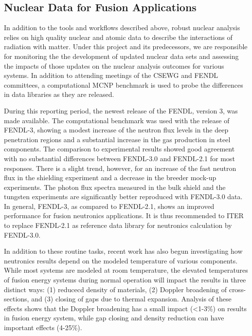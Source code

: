 \subsection{Nuclear Data for Fusion Applications}

In addition to the tools and workflows described above, robust nuclear
analysis relies on high quality nuclear and atomic data to describe the
interactions of radiation with matter.  Under this project and its
predecessors, we are responsible for monitoring the the development of updated
nuclear data sets and assessing the impacts of those updates on the nuclear
analysis outcomes for various systems.  In addition to attending meetings of
the \gls{CSEWG} and \gls{FENDL} committees, a computational MCNP benchmark is
used to probe the differences in data libraries as they are released.

During this reporting period, the newest release of the \gls{FENDL}, version
3, was made available.  The computational benchmark was used with the
release of \gls{FENDL}-3, showing a modest increase of the neutron flux levels
in the deep penetration regions and a substantial increase in the gas
production in steel components.  The comparison to experimental results showed
good agreement with no substantial differences between FENDL-3.0 and FENDL-2.1
for most responses.  There is a slight trend, however, for an increase of the
fast neutron flux in the shielding experiment and a decrease in the breeder
mock-up experiments. The photon flux spectra measured in the bulk shield and
the tungsten experiments are significantly better reproduced with FENDL-3.0
data. In general, FENDL-3, as compared to FENDL-2.1, shows an improved
performance for fusion neutronics applications. It is thus recommended to ITER
to replace FENDL-2.1 as reference data library for neutronics calculation by
FENDL-3.0.\cite{fischer_benchmarking_2014, bohm_impact_2015}

In addition to these routine tasks, recent work has also begun investigating
how neutronics results depend on the modeled temperature of various
components.  While most systems are modeled at room temperature, the elevated
temperatures of fusion energy systems during normal operation will impact the
results in three distinct ways: (1) reducecd density of materials, (2) Doppler
broadening of cross-sections, and (3) closing of gaps due to thermal
expansion.  Analysis of these effects shows that the Doppler broadening has a
small impact (<1-3\%) on results in fusion energy system, while gap closing
and density reduction can have important effects (4-25\%).




